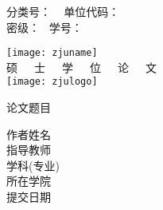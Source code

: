 \begin{center}

{
    分类号： ~\zjuunderline{90pt}{}\hfill
    单位代码：~\\
    \vspace{3pt}
    密\quad 级：~\zjuunderline{90pt}{}\hfill
    学\quad\quad 号：~\zjuunderline{60pt}{}\\
}
    
{
    \vspace{10mm}
    \texttt{[image: zjuname]}\\
    \vspace{10mm}
    \yihao 硕~~~士~~~学~~~位~~~论~~~文 \\
    \vspace{10mm}
    \texttt{[image: zjulogo]}
}

{
    \vspace{10mm}
    \xiaoer
    {
        论文题目~ \underline{\makebox[10cm]{\zjutitlec}} \\
        \vspace{0.5cm}
        \hspace{4.6em} \underline{\makebox[10cm]{\zjutitlecl}}
    }

    \newlength{\titlelength}
    \setlength{\titlelength}{5.8cm}
    \vspace{2.22cm}
    \linespread{2.2} %
    \sihao
    作者姓名   ~ \underline{\makebox[\titlelength]{\zjuauthornamec}} \\
    指导教师   ~ \underline{\makebox[\titlelength]{\zjuadvisorc}} \\
    学科(专业) ~ \underline{\makebox[\titlelength - 1.3em]{\zjumajorc}} \\
    所在学院   ~ \underline{\makebox[\titlelength]{\zjucollegec}} \\
    提交日期   ~ \underline{\makebox[\titlelength]{\zjudatec}} \\
}

\end{center}
